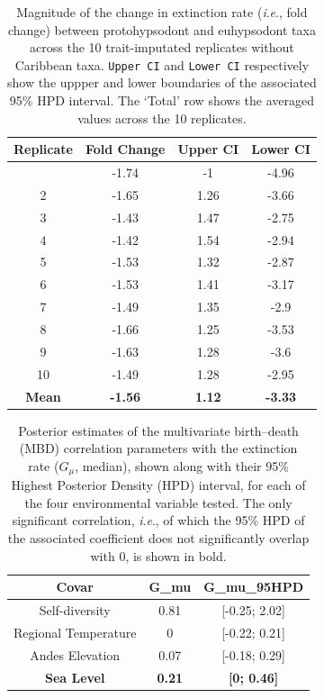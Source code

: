 \documentclass[
  9pt,
  letterpaper,
]{article}
\begin{document}
\begin{longtable}[]{@{}cccc@{}}

\caption{\label{tbl-FC_hypso}Magnitude of the change in extinction rate
(\emph{i}.\emph{e}., fold change) between protohypsodont and euhypsodont
taxa across the 10 trait-imputated replicates without Caribbean taxa.
\texttt{Upper\ CI} and \texttt{Lower\ CI} respectively show the uppper
and lower boundaries of the associated 95\% HPD interval. The `Total'
row shows the averaged values across the 10 replicates.}

\tabularnewline

\toprule\noalign{}
Replicate & Fold Change & Upper CI & Lower CI \\
\midrule\noalign{}
\endhead
\bottomrule\noalign{}
\endlastfoot
1 & -1.74 & -1 & -4.96 \\
2 & -1.65 & 1.26 & -3.66 \\
3 & -1.43 & 1.47 & -2.75 \\
4 & -1.42 & 1.54 & -2.94 \\
5 & -1.53 & 1.32 & -2.87 \\
6 & -1.53 & 1.41 & -3.17 \\
7 & -1.49 & 1.35 & -2.9 \\
8 & -1.66 & 1.25 & -3.53 \\
9 & -1.63 & 1.28 & -3.6 \\
10 & -1.49 & 1.28 & -2.95 \\
\textbf{Mean} & \textbf{-1.56} & \textbf{1.12} & \textbf{-3.33} \\

\end{longtable}

\begin{longtable}[]{@{}ccc@{}}

\caption{\label{tbl-MBDex}Posterior estimates of the multivariate
birth--death (MBD) correlation parameters with the extinction rate
(\(G_{\mu}\), median), shown along with their 95\% Highest Posterior
Density (HPD) interval, for each of the four environmental variable
tested. The only significant correlation, \emph{i}.\emph{e}., of which
the 95\% HPD of the associated coefficient does not significantly
overlap with 0, is shown in bold.}

\tabularnewline

\toprule\noalign{}
Covar & G\_mu & G\_mu\_95HPD \\
\midrule\noalign{}
\endhead
\bottomrule\noalign{}
\endlastfoot
Self-diversity & 0.81 & {[}-0.25; 2.02{]} \\
Regional Temperature & 0 & {[}-0.22; 0.21{]} \\
Andes Elevation & 0.07 & {[}-0.18; 0.29{]} \\
\textbf{Sea Level} & \textbf{0.21} & \textbf{{[}0; 0.46{]}} \\

\end{longtable}
\end{document}
